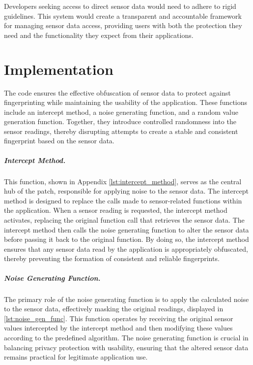 \documentclass[11pt,
  oneside,openany,    %
]{scrreprt}
\begin{document}
Developers seeking access to direct sensor data would need to adhere to rigid guidelines.
This system would create a transparent and accountable framework for managing sensor data access, providing users with both the protection they need and the functionality they expect from their applications.

\chapter{Implementation}
\label{chap:implementation}
The code ensures the effective obfuscation of sensor data to protect against fingerprinting while maintaining the usability of the application. 
These functions include an intercept method, a noise generating function, and a random value generation function. 
Together, they introduce controlled randomness into the sensor readings, thereby disrupting attempts to create a stable and consistent fingerprint based on the sensor data.

\paragraph{Intercept Method.}
\label{par:intercept_method}
This function, shown in Appendix \ref{lst:intercept_method}, serves as the central hub of the patch, responsible for applying noise to the sensor data.
The intercept method is designed to replace the calls made to sensor-related functions within the application. 
When a sensor reading is requested, the intercept method activates, replacing the original function call that retrieves the sensor data.
The intercept method then calls the noise generating function to alter the sensor data before passing it back to the original function. 
By doing so, the intercept method ensures that any sensor data read by the application is appropriately obfuscated, thereby preventing the formation of consistent and reliable fingerprints.

\paragraph{Noise Generating Function.}
\label{par:noise_gen_func}
The primary role of the noise generating function is to apply the calculated noise to the sensor data, effectively masking the original readings, displayed in \ref{lst:noise_gen_func}.
This function operates by receiving the original sensor values intercepted by the intercept method and then modifying these values according to the predefined algorithm. 
The noise generating function is crucial in balancing privacy protection with usability, ensuring that the altered sensor data remains practical for legitimate application use.
\end{document}
